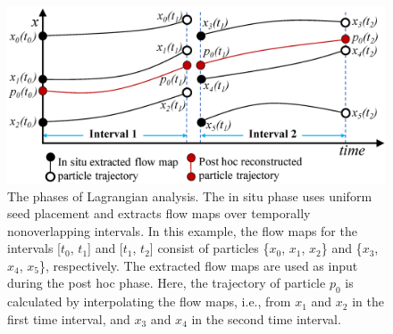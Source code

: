 \begin{figure}[!t]
\centering
\includegraphics[width=\linewidth]{Images/phases_new_tall.eps}
\caption{The phases of Lagrangian analysis. The in situ phase uses uniform seed placement and extracts flow maps over temporally nonoverlapping intervals. 
%
In this example, the flow maps for the intervals [$t_0$, $t_1$] and [$t_1$, $t_2$] consist of particles \{$x_0$, $x_1$, $x_2$\} and \{$x_3$, $x_4$, $x_5$\}, respectively. 
%
The extracted flow maps are used as input during the post hoc phase. 
%
Here, the trajectory of particle $p_0$ is calculated by interpolating the flow maps, i.e., from $x_1$ and $x_2$ in the first time interval, and $x_3$ and $x_4$ in the second time interval.}
\vspace{-8mm} 
\label{fig:phases}
\end{figure}
